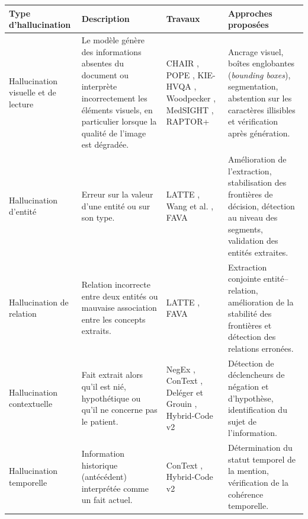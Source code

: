 \begin{table}[ht]
\centering
\footnotesize
\renewcommand{\arraystretch}{1.35}
\begin{tabular}{|p{2.8cm}|p{4.4cm}|p{3.5cm}|p{4.3cm}|}
\hline
\textbf{Type d'hallucination} &
\textbf{Description} &
\textbf{Travaux} &
\textbf{Approches proposées} \\
\hline

Hallucination visuelle et de lecture &
Le modèle génère des informations absentes du document ou interprète incorrectement les éléments visuels, en particulier lorsque la qualité de l'image est dégradée. &
CHAIR \cite{rohrbach2018chair}, POPE \cite{li2023pope}, KIE-HVQA \cite{he2025seeing}, Woodpecker \cite{woodpecker2023}, MedSIGHT \cite{chang2026medsight}, RAPTOR+ \cite{raptorplus2026} &
Ancrage visuel, boîtes englobantes (\textit{bounding boxes}), segmentation, abstention sur les caractères illisibles et vérification après génération.\\
\hline

Hallucination d'entité &
Erreur sur la valeur d'une entité ou sur son type. &
LATTE \cite{zhang2026latte}, Wang et al. \cite{wang2024feature}, FAVA \cite{mishra2024fava} &
Amélioration de l'extraction, stabilisation des frontières de décision, détection au niveau des segments, validation des entités extraites.\\
\hline

Hallucination de relation &
Relation incorrecte entre deux entités ou mauvaise association entre les concepts extraits. &
LATTE \cite{zhang2026latte}, FAVA \cite{mishra2024fava} &
Extraction conjointe entité--relation, amélioration de la stabilité des frontières et détection des relations erronées.\\
\hline

Hallucination contextuelle &
Fait extrait alors qu'il est nié, hypothétique ou qu'il ne concerne pas le patient. &
NegEx \cite{chapman2001negex}, ConText \cite{harkema2009context}, Deléger et Grouin \cite{deleger2012negation}, Hybrid-Code v2 \cite{hybrid2512v2} &
Détection de déclencheurs de négation et d'hypothèse, identification du sujet de l'information.\\
\hline

Hallucination temporelle &
Information historique (antécédent) interprétée comme un fait actuel. &
ConText \cite{harkema2009context}, Hybrid-Code v2 \cite{hybrid2512v2} &
Détermination du statut temporel de la mention, vérification de la cohérence temporelle.\\
\hline


\end{tabular}
\end{table}
